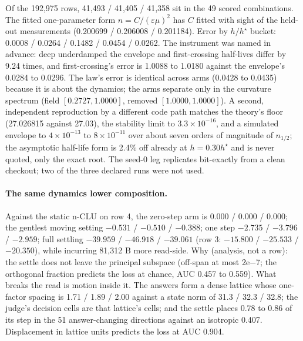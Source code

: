 \documentclass{article} %
\newcommand{\sci}[2]{\ensuremath{#1\times10^{#2}}}
\begin{document}
\noindent Of the 192,975 rows, 41,493 / 41,405 / 41,358 sit in the 49 scored combinations. The fitted
one-parameter form $n=C/(\varepsilon\mu)^2$ has $C$ fitted with sight of the held-out measurements
(0.200699 / 0.206008 / 0.201184). %
Error by $h/h^\star$ bucket: 0.0008 / 0.0264 / 0.1482 / 0.0454 / 0.0262. The instrument was named in
advance: deep underdamped the envelope and first-crossing half-lives differ by 9.24 times, and
first-crossing's error is 1.0088 to 1.0180 against the envelope's 0.0284 to 0.0296.
The law's error is identical across arms (0.0428 to 0.0435) because it is about the dynamics; the
arms separate only in the curvature spectrum (field $[0.2727, 1.0000]$, removed $[1.0000, 1.0000]$).
A second, independent reproduction by a different code path matches the theory's floor
(27.026815 against 27.03), the stability limit to \sci{3.3}{-16}, and a simulated envelope to
\sci{4}{-13} to \sci{8}{-11} over about seven orders of magnitude of $n_{1/2}$; the asymptotic
half-life form is 2.4\% off already at $h=0.30h^\star$ and is never quoted, only the exact root.
The seed-0 leg replicates bit-exactly from a clean checkout; two of the three declared runs
were not used. %

\paragraph{The same dynamics lower composition.} Against the static n-CLU on row 4, the zero-step
arm is $0.000$ / $0.000$ / $0.000$; the gentlest moving setting $-0.531$ / $-0.510$ / $-0.388$; one
step $-2.735$ / $-3.796$ / $-2.959$; full settling $-39.959$ / $-46.918$ / $-39.061$ (row 3:
$-15.800$ / $-25.533$ / $-20.350$), while incurring 81,312 B more read-side.
Why (analysis, not a row): the settle does not leave the principal subspace (off-span at most
2e$-$7; the orthogonal fraction predicts the loss at chance, AUC 0.457 to 0.559). What breaks the
read is motion inside it. The answers form a dense lattice whose one-factor spacing is 1.71 / 1.89 /
2.00 against a state norm of 31.3 / 32.3 / 32.8; the judge's decision cells are that lattice's
cells; and the settle places 0.78 to 0.86 of its step in the 51 answer-changing directions against
an isotropic 0.407. Displacement in lattice units predicts the loss at AUC 0.904.
\end{document}
